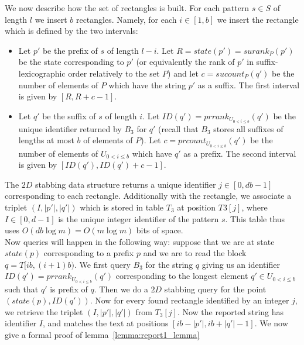 \documentclass{article}
\newcommand{\?}{\mskip1.5mu}
\begin{document}
We now describe how the set of rectangles is built. For each pattern $s\in S$ of length $l$ we insert $b$ rectangles. Namely, for each $i\in[1,b]$ we insert the rectangle which is defined by the two intervals:
\begin{itemize}
\item Let $p'$ be the prefix of $s$ of length $l-i$. Let $R=state(p')=surank_P(p')$ be the state corresponding to $p'$ (or equivalently the rank of $p'$ in suffix-lexicographic order relatively to the set $P$) and let $c=sucount_{P}(q')$ be the number of elements of $P$ which have the string $p'$ as a suffix. The first interval is given by $[R,R+c-1]$.
\item Let $q'$ be the suffix of $s$ of length $i$. Let $ID(q')=prrank_{U_{0<i\leq b}}(q')$ be the unique identifier returned by $B_3$ for $q'$ (recall that $B_3$ stores all suffixes of lengths at most $b$ of elements of $P$). Let $c=prcount_{U_{0<i\leq b}}(q')$ be the number of elements of $U_{0<i\leq b}$ which have $q'$ as a prefix. The second interval is given by $[ID(q'),ID(q')+c-1]$. 
\end{itemize}
The $2D$ stabbing data structure returns a unique identifier $j\in[0,db-1]$ corresponding to each rectangle. Additionally with the rectangle, we associate a triplet $(I,|p'|,|q'|)$ which is stored in table $T_3$ at position $T3[j]$, where $I\in[0,d-1]$ is the unique integer identifier of the pattern $s$. This table thus uses $O(db\log m)=O(m\log m)$ bits of space.
\\Now queries will happen in the following way: suppose that we are at state $state(p)$ corresponding to a prefix $p$ and we are to read the block $q=T[ib,(i+1)b)$. We first query $B_3$ for the string $q$ giving us an identifier $ID(q')=prrank_{U_{0<i\leq b}}(q')$ corresponding to the longest element $q'\in U_{0<i\leq b}$ such that $q'$ is prefix of $q$. Then we do a $2D$ stabbing query for the point $(state(p),ID(q'))$. Now for every found rectangle identified by an integer $j$, we retrieve the triplet $(I,|p'|,|q'|)$ from $T_3[j]$. Now the reported string has identifier $I$, and matches the text at positions $[ib-|p'|,ib+|q'|-1]$.  
We now give a formal proof of lemma~\ref{lemma:report1_lemma}
\end{document}
